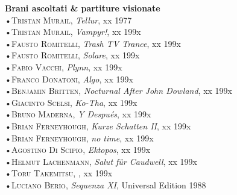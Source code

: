 \documentclass[oneside]{article}
\begin{document}
\begin{multicols*}{2}
\textbf{\textsf{Brani ascoltati \& partiture visionate}}\\
•\textsc{\textsf {Tristan Murail}}, \emph{Tellur}, xx 1977\\
•\textsc{\textsf {Tristan Murail}}, \emph{Vampyr!}, xx 199x\\
•\textsc{\textsf {Fausto Romitelli}}, \emph{Trash TV Trance}, xx 199x\\
•\textsc{\textsf {Fausto Romitelli}}, \emph{Solare}, xx 199x\\
•\textsc{\textsf {Fabio Vacchi}}, \emph{Plynn}, xx 199x\\
•\textsc{\textsf {Franco Donatoni}}, \emph{Algo}, xx 199x\\
•\textsc{\textsf {Benjamin Britten}}, \emph{Nocturnal After John Dowland}, xx 199x\\
•\textsc{\textsf {Giacinto Scelsi}}, \emph{Ko-Tha}, xx 199x\\
•\textsc{\textsf {Bruno Maderna}}, \emph{Y Después}, xx 199x\\
•\textsc{\textsf {Brian Ferneyhough}}, \emph{Kurze Schatten II}, xx 199x\\
•\textsc{\textsf {Brian Ferneyhough}}, \emph{no time}, xx 199x\\
•\textsc{\textsf {Agostino Di Scipio}}, \emph{Ektopos}, xx 199x\\
•\textsc{\textsf {Helmut Lachenmann}}, \emph{Salut für Caudwell}, xx 199x\\
•\textsc{\textsf {Toru Takemitsu}}, \emph{}, xx 199x\\
•\textsc{\textsf {Luciano Berio}}, \emph{Sequenza XI}, Universal Edition 1988\\

\end{multicols*}
\end{document}
